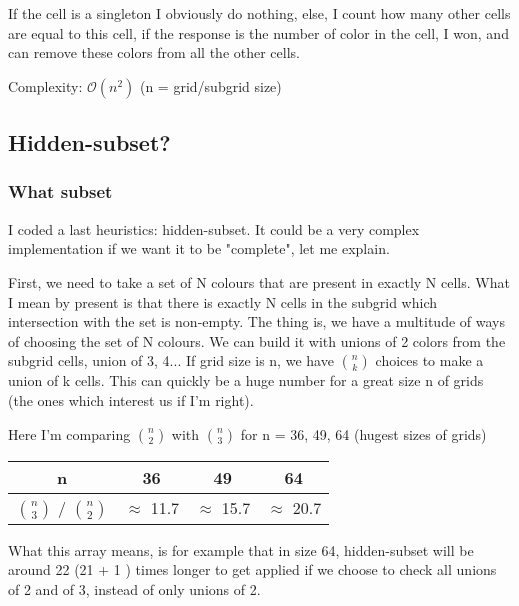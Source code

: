 \documentclass{article}
\begin{document}
\vspace{1\baselineskip}
If the cell is a singleton I obviously do nothing, else, I count how many other cells are equal to this cell, if the response is the number of color in the cell, I won, and can remove these colors from all the other cells.

Complexity: $\mathcal{O}(n^2)$ (n = grid/subgrid size)

\subsection{Hidden-subset?}

\subsubsection{What subset}

I coded a last heuristics: hidden-subset. It could be a very complex implementation if we want it to be "complete", let me explain.

First, we need to take a set of N colours that are present in exactly N cells. What I mean by present is that there is exactly N cells in the subgrid which intersection with the set is non-empty. The thing is, we have a multitude of ways of choosing the set of N colours. We can build it with unions of 2 colors from the subgrid cells, union of 3, 4...  If grid size is n, we have $\binom{n}{k}$ choices to make a union of k cells. This can quickly be a huge number for a great size n of grids (the ones which interest us if I'm right).

\vspace{1\baselineskip}
Here I'm comparing $\binom{n}{2}$ with $\binom{n}{3}$ for n = 36, 49, 64 (hugest sizes of grids)

\vspace{1\baselineskip}
\begin{center}
   \begin{tabular}[b]{|*{4}{c|}}
	 \hline n & 36 & 49 & 64\\ 
	 \hline $\binom{n}{3}$ / $\binom{n}{2}$ & $\approx$ 11.7 & $\approx$ 15.7 & $\approx$ 20.7\\ 
	 \hline 
   \end{tabular}
\end{center}

What this array means, is for example that in size 64, hidden-subset will be around 22 (21 + 1 ) times longer to get applied if we choose to check all unions of 2 and of 3, instead of only unions of 2. 
\end{document}
